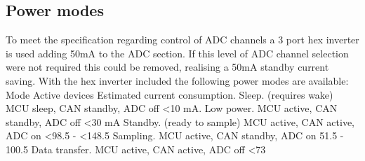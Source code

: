 \subsection{Power modes}
To meet the specification regarding control of ADC channels a 3 port hex inverter is used adding 50mA to the ADC section. If this level of ADC channel selection were not required this could be removed, realising a 50mA standby current saving. With the hex inverter included the following power modes are available:
Mode							Active devices	 					Estimated current consumption.
Sleep. (requires wake)				MCU sleep, CAN standby, ADC off 		<10 mA. 
Low power. 						MCU active, CAN standby, ADC off		<30 mA
Standby. (ready to sample)		MCU active, CAN active, ADC on		<98.5 - <148.5
Sampling.						MCU active, CAN standby, ADC on		51.5 - 100.5 	
Data transfer.					MCU active, CAN active, ADC off		<73
